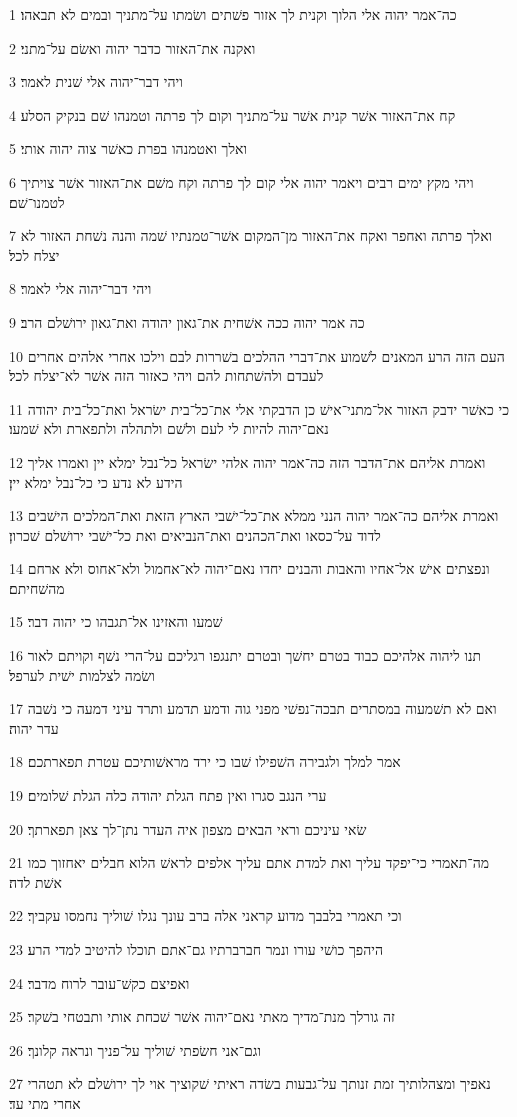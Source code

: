 \par 1 כה־אמר יהוה אלי הלוך וקנית לך אזור פשׁתים ושׂמתו על־מתניך ובמים לא תבאהו׃
\par 2 ואקנה את־האזור כדבר יהוה ואשׂם על־מתני׃
\par 3 ויהי דבר־יהוה אלי שׁנית לאמר׃
\par 4 קח את־האזור אשׁר קנית אשׁר על־מתניך וקום לך פרתה וטמנהו שׁם בנקיק הסלע׃
\par 5 ואלך ואטמנהו בפרת כאשׁר צוה יהוה אותי׃
\par 6 ויהי מקץ ימים רבים ויאמר יהוה אלי קום לך פרתה וקח משׁם את־האזור אשׁר צויתיך לטמנו־שׁם׃
\par 7 ואלך פרתה ואחפר ואקח את־האזור מן־המקום אשׁר־טמנתיו שׁמה והנה נשׁחת האזור לא יצלח לכל׃
\par 8 ויהי דבר־יהוה אלי לאמר׃
\par 9 כה אמר יהוה ככה אשׁחית את־גאון יהודה ואת־גאון ירושׁלם הרב׃
\par 10 העם הזה הרע המאנים לשׁמוע את־דברי ההלכים בשׁררות לבם וילכו אחרי אלהים אחרים לעבדם ולהשׁתחות להם ויהי כאזור הזה אשׁר לא־יצלח לכל׃
\par 11 כי כאשׁר ידבק האזור אל־מתני־אישׁ כן הדבקתי אלי את־כל־בית ישׂראל ואת־כל־בית יהודה נאם־יהוה להיות לי לעם ולשׁם ולתהלה ולתפארת ולא שׁמעו׃
\par 12 ואמרת אליהם את־הדבר הזה כה־אמר יהוה אלהי ישׂראל כל־נבל ימלא יין ואמרו אליך הידע לא נדע כי כל־נבל ימלא יין׃
\par 13 ואמרת אליהם כה־אמר יהוה הנני ממלא את־כל־ישׁבי הארץ הזאת ואת־המלכים הישׁבים לדוד על־כסאו ואת־הכהנים ואת־הנביאים ואת כל־ישׁבי ירושׁלם שׁכרון׃
\par 14 ונפצתים אישׁ אל־אחיו והאבות והבנים יחדו נאם־יהוה לא־אחמול ולא־אחוס ולא ארחם מהשׁחיתם׃
\par 15 שׁמעו והאזינו אל־תגבהו כי יהוה דבר׃
\par 16 תנו ליהוה אלהיכם כבוד בטרם יחשׁך ובטרם יתנגפו רגליכם על־הרי נשׁף וקויתם לאור ושׂמה לצלמות ישׁית לערפל׃
\par 17 ואם לא תשׁמעוה במסתרים תבכה־נפשׁי מפני גוה ודמע תדמע ותרד עיני דמעה כי נשׁבה עדר יהוה׃
\par 18 אמר למלך ולגבירה השׁפילו שׁבו כי ירד מראשׁותיכם עטרת תפארתכם׃
\par 19 ערי הנגב סגרו ואין פתח הגלת יהודה כלה הגלת שׁלומים׃
\par 20 שׂאי עיניכם וראי הבאים מצפון איה העדר נתן־לך צאן תפארתך׃
\par 21 מה־תאמרי כי־יפקד עליך ואת למדת אתם עליך אלפים לראשׁ הלוא חבלים יאחזוך כמו אשׁת לדה׃
\par 22 וכי תאמרי בלבבך מדוע קראני אלה ברב עונך נגלו שׁוליך נחמסו עקביך׃
\par 23 היהפך כושׁי עורו ונמר חברברתיו גם־אתם תוכלו להיטיב למדי הרע׃
\par 24 ואפיצם כקשׁ־עובר לרוח מדבר׃
\par 25 זה גורלך מנת־מדיך מאתי נאם־יהוה אשׁר שׁכחת אותי ותבטחי בשׁקר׃
\par 26 וגם־אני חשׂפתי שׁוליך על־פניך ונראה קלונך׃
\par 27 נאפיך ומצהלותיך זמת זנותך על־גבעות בשׂדה ראיתי שׁקוציך אוי לך ירושׁלם לא תטהרי אחרי מתי עד׃

